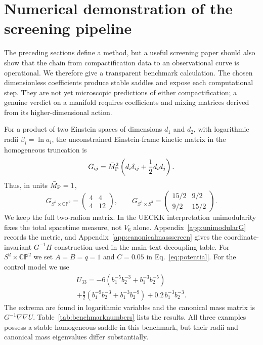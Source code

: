 \documentclass[aps,prd,twocolumn,superscriptaddress,nofootinbib,longbibliography,floatfix]{revtex4-2}
\newcommand{\Mpl}{\bar M_{\rm P}}
\newcommand{\CP}{\mathbb{CP}}
\begin{document}
\section{Numerical demonstration of the screening pipeline}
\label{sec:numericaldemo}
The preceding sections define a method, but a useful screening paper should also show that the chain from compactification data to an observational curve is operational. We therefore give a transparent benchmark calculation. The chosen dimensionless coefficients produce stable saddles and expose each computational step. They are not yet microscopic predictions of either compactification; a genuine verdict on a manifold requires coefficients and mixing matrices derived from its higher-dimensional action.

For a product of two Einstein spaces of dimensions $d_1$ and $d_2$, with logarithmic radii $\beta_i=\ln a_i$, the unconstrained Einstein-frame kinetic matrix in the homogeneous truncation is
\begin{equation}
G_{ij}=\Mpl^2\left(d_i\delta_{ij}+\frac12 d_i d_j\right).
\label{eq:kineticmatrixbenchmark}
\end{equation}
Thus, in units $\Mpl=1$,
\begin{equation}
G_{S^2\times\CP^2}=\begin{pmatrix}4&4\\4&12\end{pmatrix},\qquad
G_{S^3\times S^3}=\begin{pmatrix}15/2&9/2\\9/2&15/2\end{pmatrix}.
\end{equation}
We keep the full two-radion matrix. In the UECKK interpretation unimodularity fixes the total spacetime measure, not $V_6$ alone. Appendix~\ref{app:unimodularG} records the metric, and Appendix~\ref{app:canonicalmassscreen} gives the coordinate-invariant $G^{-1}H$ construction used in the main-text decoupling table.
For $S^2\times\CP^2$ we set $A=B=q=1$ and $C=0.05$ in Eq.~\eqref{eq:potential}. For the control model we use
\begin{multline}
U_{33}=-6\left(b_1^{-5}b_2^{-3}+b_1^{-3}b_2^{-5}\right)\\
+\frac92\left(b_1^{-9}b_2^{-3}+b_1^{-3}b_2^{-9}\right)
+0.2\,b_1^{-3}b_2^{-3}.
\label{eq:s3benchmarkpotential}
\end{multline}
The extrema are found in logarithmic variables and the canonical mass matrix is $G^{-1}\nabla\nabla U$. Table~\ref{tab:benchmarknumbers} lists the results. All three examples possess a stable homogeneous saddle in this benchmark, but their radii and canonical mass eigenvalues differ substantially.
\end{document}
